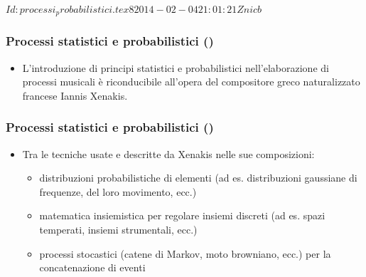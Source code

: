 %
%
\svnInfo $Id: processi_probabilistici.tex 8 2014-02-04 21:01:21Z nicb $

\setcounter{ms}{0}
\begin{frame}
    \frametitle{Processi statistici e probabilistici ()}

    \begin{itemize}

        \item L'introduzione di principi statistici e
            probabilistici nell'elaborazione
            di processi musicali \`e riconducibile
            all'opera del compositore greco
            naturalizzato francese Iannis Xenakis.

    \end{itemize}

\end{frame}

\begin{frame}
    \frametitle{Processi statistici e probabilistici ()}

    \begin{itemize}
        \item Tra le tecniche usate
              e descritte da Xenakis nelle sue composizioni:

            \begin{itemize}

                \item distribuzioni probabilistiche di elementi
                    (ad es. distribuzioni gaussiane di frequenze, del loro movimento, ecc.)

                \item matematica insiemistica per regolare insiemi discreti
                    (ad es. spazi temperati, insiemi strumentali, ecc.)

                \item processi stocastici
                    (catene di Markov, moto browniano, ecc.)
                    per la concatenazione di eventi

            \end{itemize}

    \end{itemize}

\end{frame}
